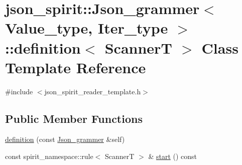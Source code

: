\hypertarget{classjson__spirit_1_1_json__grammer_1_1definition}{}\section{json\+\_\+spirit\+:\+:Json\+\_\+grammer$<$ Value\+\_\+type, Iter\+\_\+type $>$\+:\+:definition$<$ Scanner\+T $>$ Class Template Reference}
\label{classjson__spirit_1_1_json__grammer_1_1definition}


{\ttfamily \#include $<$json\+\_\+spirit\+\_\+reader\+\_\+template.\+h$>$}

\subsection*{Public Member Functions}
\begin{DoxyCompactItemize}
\item 
\hyperlink{classjson__spirit_1_1_json__grammer_1_1definition_a00806fdc7bd694565d5106a61f62e3af}{definition} (const \hyperlink{classjson__spirit_1_1_json__grammer}{Json\+\_\+grammer} \&self)
\item 
const spirit\+\_\+namespace\+::rule$<$ Scanner\+T $>$ \& \hyperlink{classjson__spirit_1_1_json__grammer_1_1definition_a3b8b977ede8274d4d10cd390fbfa88c5}{start} () const 
\end{DoxyCompactItemize}
